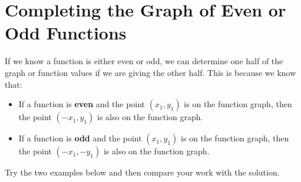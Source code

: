 \documentclass[nooutcomes]{ximera}
\begin{document}
\section{Completing the Graph of Even or Odd Functions}

If we know a function is either even or odd, we can determine one half of the graph or function values if we are giving the other half.  This is because we know that:
\begin{itemize}
\item If a function is \textbf{even} and the point $(x_1,y_1)$ is on the function graph, then the point $(-x_1,y_1)$ is also on the function graph.
\item If a function is \textbf{odd} and the point $(x_1,y_1)$ is on the function graph, then the point $(-x_1,-y_1)$ is also on the function graph.
\end{itemize}

Try the two examples below and then compare your work with the solution. 
\end{document}
